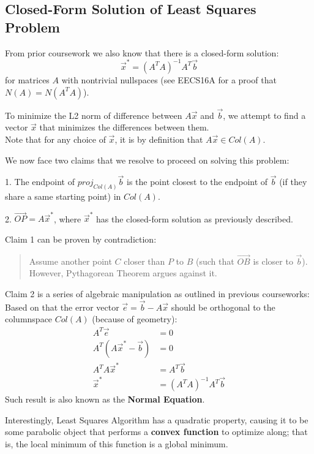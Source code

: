 \subsection{Closed-Form Solution of Least Squares Problem}
From prior coursework we also know that there is a closed-form solution:
\[\vec{x}^* = {(A^T A)}^{-1} A^T \vec{b}\]
for matrices $A$ with nontrivial nullspaces (see EECS16A for a proof that $N(A) = N(A^T A)$).
\par
To minimize the L2 norm of difference between $A \vec{x}$ and $\vec{b}$, we attempt to find a vector $\vec{x}$ that minimizes the differences between them. \\
Note that for any choice of $\vec{x}$, it is by definition that $A \vec{x} \in Col(A)$.
\par
We now face two claims that we resolve to proceed on solving this problem:
\begin{bindenum}
    \item[1.] The endpoint of ${proj}_{Col(A)} \vec{b}$ is the point closest to the endpoint of $\vec{b}$ (if they share a same starting point) in $Col(A)$.
    \item[2.] $\vec{OP} = A \vec{x}^*$, where $\vec{x}^*$ has the closed-form solution as previously described.
\end{bindenum}
Claim 1 can be proven by contradiction:
\begin{quote}
    Assume another point $C$ closer than $P$ to $B$ (such that $\vec{OB}$ is closer to $\vec{b}$). However, Pythagorean Theorem argues against it.
\end{quote}
Claim 2 is a series of algebraic manipulation as outlined in previous courseworks: \\
Based on that the error vector $\vec{e} = \vec{b} - A\vec{x}$ should be orthogonal to the columnspace $Col(A)$ (because of geometry):
\begin{align*}
    A^T \vec{e} &= 0 \\
    A^T (A \vec{x}^* - \vec{b}) &= 0 \\
    A^T A \vec{x}^* &= A^T \vec{b} \\
    \vec{x}^* &= {(A^T A)}^{-1} A^T \vec{b}
\end{align*}
Such result is also known as the \textbf{Normal Equation}.
\par
Interestingly, Least Squares Algorithm has a quadratic property, causing it to be some parabolic object that performs a \textbf{convex function} to optimize along; that is, the local minimum of this function is a global minimum.
